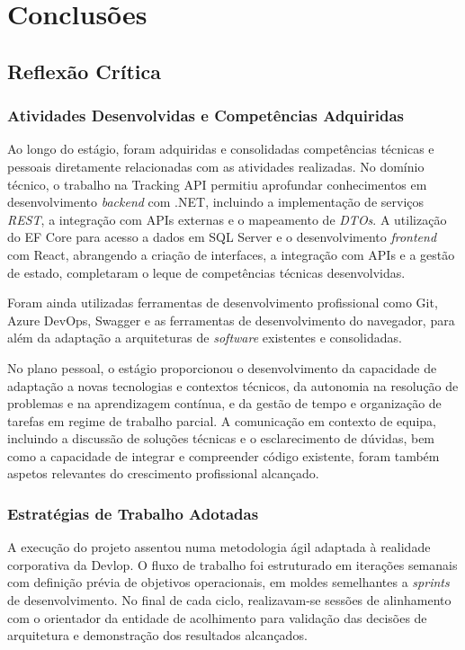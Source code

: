 \documentclass[a4paper,12pt]{report}
\begin{document}
\chapter{Conclusões}

\section{Reflexão Crítica}

\subsection{Atividades Desenvolvidas e Competências Adquiridas}

Ao longo do estágio, foram adquiridas e consolidadas competências técnicas e pessoais diretamente relacionadas com as atividades realizadas. No domínio técnico, o trabalho na Tracking API permitiu aprofundar conhecimentos em desenvolvimento \textit{backend} com .NET, incluindo a implementação de serviços \textit{REST}, a integração com APIs externas e o mapeamento de \textit{DTOs}. A utilização do EF Core para acesso a dados em SQL Server e o desenvolvimento \textit{frontend} com React, abrangendo a criação de interfaces, a integração com APIs e a gestão de estado, completaram o leque de competências técnicas desenvolvidas.

Foram ainda utilizadas ferramentas de desenvolvimento profissional como Git, Azure DevOps, Swagger e as ferramentas de desenvolvimento do navegador, para além da adaptação a arquiteturas de \textit{software} existentes e consolidadas.

No plano pessoal, o estágio proporcionou o desenvolvimento da capacidade de adaptação a novas tecnologias e contextos técnicos, da autonomia na resolução de problemas e na aprendizagem contínua, e da gestão de tempo e organização de tarefas em regime de trabalho parcial. A comunicação em contexto de equipa, incluindo a discussão de soluções técnicas e o esclarecimento de dúvidas, bem como a capacidade de integrar e compreender código existente, foram também aspetos relevantes do crescimento profissional alcançado.

\subsection{Estratégias de Trabalho Adotadas}

A execução do projeto assentou numa metodologia ágil adaptada à realidade corporativa da Devlop. O fluxo de trabalho foi estruturado em iterações semanais com definição prévia de objetivos operacionais, em moldes semelhantes a \textit{sprints} de desenvolvimento. No final de cada ciclo, realizavam-se sessões de alinhamento com o orientador da entidade de acolhimento para validação das decisões de arquitetura e demonstração dos resultados alcançados.
\end{document}
